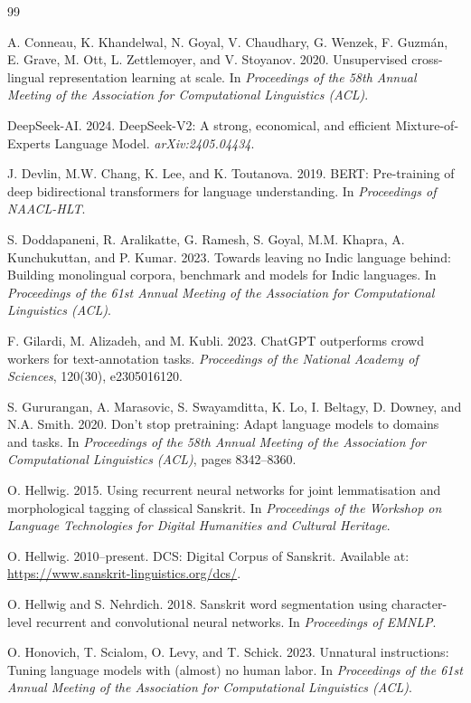 \documentclass[11pt]{article}
\begin{document}
\begin{thebibliography}{99}


 A. Conneau, K. Khandelwal, N. Goyal, V. Chaudhary, G. Wenzek, F. Guzm\'an, E. Grave, M. Ott, L. Zettlemoyer, and V. Stoyanov. 2020. Unsupervised cross-lingual representation learning at scale. In \emph{Proceedings of the 58th Annual Meeting of the Association for Computational Linguistics (ACL)}.

 DeepSeek-AI. 2024. DeepSeek-V2: A strong, economical, and efficient Mixture-of-Experts Language Model. \emph{arXiv:2405.04434}.

 J. Devlin, M.W. Chang, K. Lee, and K. Toutanova. 2019. BERT: Pre-training of deep bidirectional transformers for language understanding. In \emph{Proceedings of NAACL-HLT}.

 S. Doddapaneni, R. Aralikatte, G. Ramesh, S. Goyal, M.M. Khapra, A. Kunchukuttan, and P. Kumar. 2023. Towards leaving no Indic language behind: Building monolingual corpora, benchmark and models for Indic languages. In \emph{Proceedings of the 61st Annual Meeting of the Association for Computational Linguistics (ACL)}.

 F. Gilardi, M. Alizadeh, and M. Kubli. 2023. ChatGPT outperforms crowd workers for text-annotation tasks. \emph{Proceedings of the National Academy of Sciences}, 120(30), e2305016120.

 S. Gururangan, A. Marasovic, S. Swayamditta, K. Lo, I. Beltagy, D. Downey, and N.A. Smith. 2020. Don't stop pretraining: Adapt language models to domains and tasks. In \emph{Proceedings of the 58th Annual Meeting of the Association for Computational Linguistics (ACL)}, pages 8342--8360.

 O. Hellwig. 2015. Using recurrent neural networks for joint lemmatisation and morphological tagging of classical Sanskrit. In \emph{Proceedings of the Workshop on Language Technologies for Digital Humanities and Cultural Heritage}.

 O. Hellwig. 2010--present. DCS: Digital Corpus of Sanskrit. Available at: \url{https://www.sanskrit-linguistics.org/dcs/}.

 O. Hellwig and S. Nehrdich. 2018. Sanskrit word segmentation using character-level recurrent and convolutional neural networks. In \emph{Proceedings of EMNLP}.

 O. Honovich, T. Scialom, O. Levy, and T. Schick. 2023. Unnatural instructions: Tuning language models with (almost) no human labor. In \emph{Proceedings of the 61st Annual Meeting of the Association for Computational Linguistics (ACL)}.


\end{thebibliography}
\end{document}

